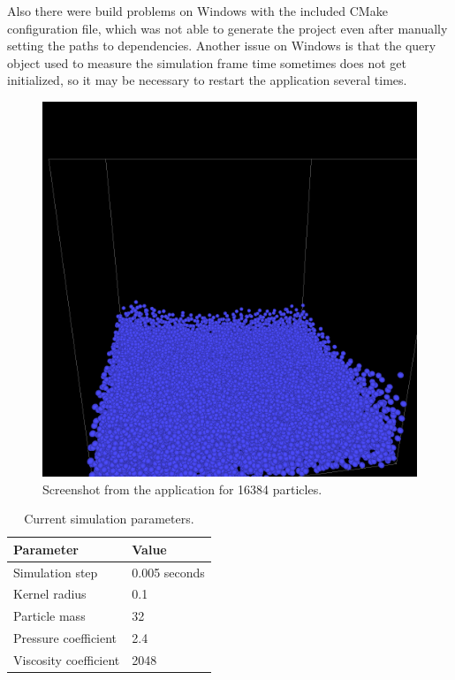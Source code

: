 \documentclass[a4paper,report]{IEEEtran}
\begin{document}
Also there were build problems on Windows with the included CMake configuration file, which was not able to generate the project even after manually setting the paths to dependencies. Another issue on Windows is that the query object used to measure the simulation frame time sometimes does not get initialized, so it may be necessary to restart the application several times.

\begin{figure}[!h]
\centering
\includegraphics[width=1\linewidth]{screenshot}
\caption{Screenshot from the application for 16384 particles.}
\label{fig:screen}
\end{figure}

\begin{table}[h]
	\normalsize
	\centering
	\begin{tabular}{|l|l|}
		\hline
		\textbf{Parameter} & \textbf{Value} \\
		\hline
		\hline
		Simulation step 	& 0.005 seconds \\
		Kernel radius 	& 0.1 \\
		Particle mass 	& 32 \\
		Pressure coefficient	& 2.4 \\ 
		Viscosity coefficient 	& 2048 \\
		\hline
	\end{tabular}
	\caption{Current simulation parameters.}
	\label{table:parameters}
\end{table}
\end{document}
